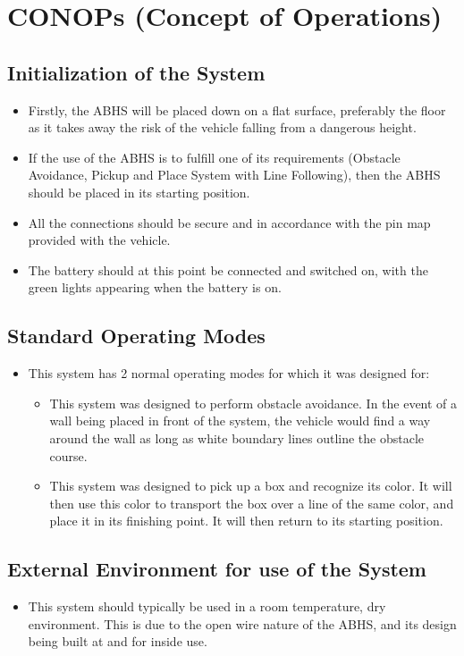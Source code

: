 \documentclass{report}
\begin{document}
\chapter{CONOPs (Concept of Operations)}\label{ch:conops}
\section{Initialization of the System}
\begin{itemize}
    \item Firstly, the \gls{ABHS} will be placed down on a flat surface, preferably the floor as it takes away the risk of the vehicle falling from a dangerous height.
    \item If the use of the \gls{ABHS} is to fulfill one of its requirements (Obstacle Avoidance, Pickup and Place System with Line Following), then the \gls{ABHS} should be placed in its starting position.
    \item All the connections should be secure and in accordance with the pin map provided with the vehicle.
    \item The battery should at this point be connected and switched on, with the green lights appearing when the battery is on.
\end{itemize}

\section{Standard Operating Modes}
\begin{itemize}
\item This system has 2 normal operating modes for which it was designed for:
    \begin{itemize}
        \item This system was designed to perform obstacle avoidance. In the event of a wall being placed in front of the system, the vehicle would find a way around the wall as long as white boundary lines outline the obstacle course.
        \item This system was designed to pick up a box and recognize its color. It will then use this color to transport the box over a line of the same color, and place it in its finishing point. It will then return to its starting position. 
\end{itemize}
\end{itemize}
\section {External Environment for use of the System}
\begin{itemize}
    \item This system should typically be used in a room temperature, dry environment. This is due to the open wire nature of the \gls{ABHS}, and its design being built at and for inside use.
\end{itemize}
\end{document}
